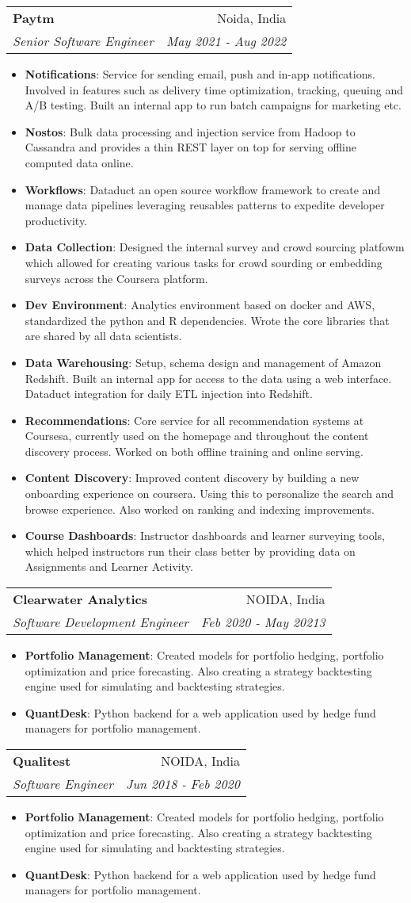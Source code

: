 \documentclass[letterpaper,11pt]{article}
\makeatletter
\newcommand{\resumeItem}[2]{
  \item\small{
    \textbf{#1}{: #2 \vspace{-2pt}}
  }
}
\newcommand{\resumeSubheading}[4]{
  \vspace{-1pt}\item
  \begin{tabular*}{0.97\textwidth}{l@{\extracolsep{\fill}}r}
    \textbf{#1} & #2 \\
    \textit{\small#3} & \textit{\small #4} \\
  \end{tabular*}\vspace{-5pt}
}
\newcommand{\resumeItemListStart}{\begin{itemize}}
\newcommand{\resumeItemListEnd}{\end{itemize}\vspace{-5pt}}
\makeatother
\begin{document}
\resumeSubheading
{Paytm}{Noida, India}
{Senior Software Engineer}{May 2021 - Aug 2022}
\resumeItemListStart
\resumeItem{Notifications}
{Service for sending email, push and in-app notifications. Involved in features such as delivery time optimization, tracking, queuing and A/B testing. Built an internal app to run batch campaigns for marketing etc.}
\resumeItem{Nostos}
{Bulk data processing and injection service from Hadoop to Cassandra and provides a thin REST layer on top for serving offline computed data online.}
\resumeItem{Workflows}
{Dataduct an open source workflow framework to create and manage data pipelines leveraging reusables patterns to expedite developer productivity.}
\resumeItem{Data Collection}
{Designed the internal survey and crowd sourcing platfowm which allowed for creating various tasks for crowd sourding or embedding surveys across the Coursera platform.}
\resumeItem{Dev Environment}
{Analytics environment based on docker and AWS, standardized the python and R dependencies. Wrote the core libraries that are shared by all data scientists.}
\resumeItem{Data Warehousing}
{Setup, schema design and management of Amazon Redshift. Built an internal app for access to the data using a web interface. Dataduct integration for daily ETL injection into Redshift.}
\resumeItem{Recommendations}
{Core service for all recommendation systems at Coursesa, currently used on the homepage and throughout the content discovery process. Worked on both offline training and online serving.}
\resumeItem{Content Discovery}
{Improved content discovery by building a new onboarding experience on coursera. Using this to personalize the search and browse experience. Also worked on ranking and indexing improvements.}
\resumeItem{Course Dashboards}
{Instructor dashboards and learner surveying tools, which helped instructors run their class better by providing data on Assignments and Learner Activity.}
\resumeItemListEnd

\resumeSubheading
{Clearwater Analytics}{NOIDA, India}
{Software Development Engineer}{Feb 2020 - May 20213}
\resumeItemListStart
\resumeItem{Portfolio Management}
{Created models for portfolio hedging,  portfolio optimization and price forecasting. Also creating a strategy backtesting engine used for simulating and backtesting strategies.}
\resumeItem{QuantDesk}
{Python backend for a web application used by hedge fund managers for portfolio management.}
\resumeItemListEnd

\resumeSubheading
{Qualitest}{NOIDA, India}
{Software Engineer}{Jun 2018 - Feb 2020}
\resumeItemListStart
\resumeItem{Portfolio Management}
{Created models for portfolio hedging,  portfolio optimization and price forecasting. Also creating a strategy backtesting engine used for simulating and backtesting strategies.}
\resumeItem{QuantDesk}
{Python backend for a web application used by hedge fund managers for portfolio management.}
\resumeItemListEnd
\end{document}
